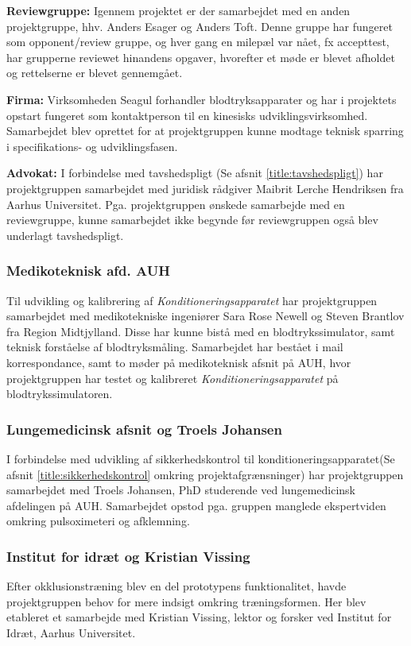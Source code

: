 \textbf{Reviewgruppe:} Igennem projektet er der samarbejdet med en anden projektgruppe, hhv. Anders Esager og Anders Toft. Denne gruppe har fungeret som opponent/review gruppe, og hver gang en milepæl var nået, fx accepttest, har grupperne reviewet hinandens opgaver, hvorefter et møde er blevet afholdet og rettelserne er blevet gennemgået.  

\textbf{Firma:} Virksomheden Seagul forhandler blodtryksapparater og har i projektets opstart fungeret som kontaktperson til en kinesisks udviklingsvirksomhed. Samarbejdet blev oprettet for at projektgruppen kunne modtage teknisk sparring i specifikations- og udviklingsfasen. 

\textbf{Advokat:} I forbindelse med tavshedspligt (Se afsnit \ref{title:tavshedspligt}) har projektgruppen samarbejdet med juridisk rådgiver Maibrit Lerche Hendriksen fra Aarhus Universitet. Pga. projektgruppen ønskede samarbejde med en reviewgruppe, kunne samarbejdet ikke begynde før reviewgruppen også blev underlagt tavshedspligt.

\subsubsection{Medikoteknisk afd. AUH}
Til udvikling og kalibrering af \textit{Konditioneringsapparatet} har projektgruppen samarbejdet med medikotekniske ingeniører  Sara Rose Newell og Steven Brantlov fra Region Midtjylland. Disse har kunne bistå med en blodtrykssimulator, samt teknisk forståelse af blodtryksmåling. Samarbejdet har bestået i mail korrespondance, samt to møder på medikoteknisk afsnit på AUH, hvor projektgruppen har testet og kalibreret \textit{Konditioneringsapparatet} på blodtrykssimulatoren. 

\subsubsection{Lungemedicinsk afsnit og Troels Johansen}
I forbindelse med udvikling af sikkerhedskontrol til konditioneringsapparatet(Se afsnit \ref{title:sikkerhedskontrol} omkring projektafgrænsninger) har projektgruppen samarbejdet med Troels Johansen, PhD studerende ved lungemedicinsk afdelingen på AUH. Samarbejdet opstod pga. gruppen manglede ekspertviden omkring pulsoximeteri og afklemning.

\subsubsection{Institut for idræt og Kristian Vissing} 
Efter okklusionstræning blev en del prototypens funktionalitet, havde projektgruppen behov for mere indsigt omkring træningsformen. Her blev etableret et samarbejde med Kristian Vissing, lektor og forsker ved Institut for Idræt, Aarhus Universitet.  

